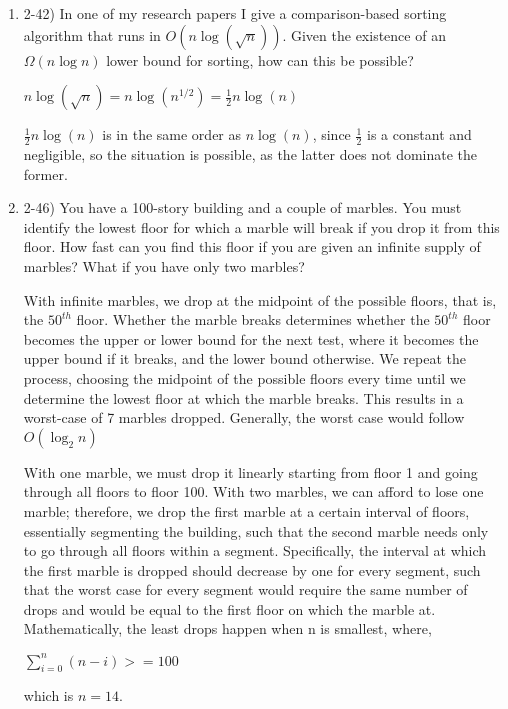 \documentclass{article}
\begin{document}
\begin{enumerate}
    \item 2-42) In one of my research papers I give a comparison-based sorting algorithm that runs in $O(n \log(\sqrt{n}))$. Given the existence of an $\Omega(n \log n)$ lower bound for sorting, how can this be possible?
    
    \(n \log(\sqrt{n}) = n \log(n^{1/2}) = \frac{1}{2} n \log(n)\)

    \(\frac{1}{2} n \log(n) \) is in the same order as \(n \log(n)\), since \(\frac{1}{2}\) is a constant and negligible, so the situation is possible, as the latter does not dominate the former.
    
    \item 2-46) You have a 100-story building and a couple of marbles. You must identify the lowest floor for which a marble will break if you drop it from this floor. How fast can you find this floor if you are given an infinite supply of marbles? What if you have only two marbles?

    With infinite marbles, we drop at the midpoint of the possible floors, that is, the $50^{th}$ floor. Whether the marble breaks determines whether the $50^{th}$ floor becomes the upper or lower bound for the next test, where it becomes the upper bound if it breaks, and the lower bound otherwise. We repeat the process, choosing the midpoint of the possible floors every time until we determine the lowest floor at which the marble breaks. This results in a worst-case of 7 marbles dropped. Generally, the worst case would follow $O(\log_2 n)$

    With one marble, we must drop it linearly starting from floor 1 and going through all floors to floor 100. With two marbles, we can afford to lose one marble; therefore, we drop the first marble at a certain interval of floors, essentially segmenting the building, such that the second marble needs only to go through all floors within a segment. Specifically, the interval at which the first marble is dropped should decrease by one for every segment, such that the worst case for every segment would require the same number of drops and would be equal to the first floor on which the marble at. Mathematically, the least drops happen when n is smallest, where,
    
    \(\sum^n_{i=0}(n-i) >= 100\)

    which is $ n = 14$.
    
\end{enumerate}
\end{document}
